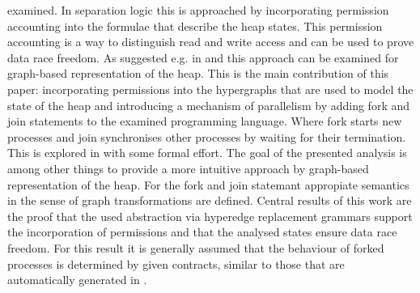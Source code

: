 	examined. In separation logic this is approached by incorporating permission
	accounting into the formulae that describe the heap states. This permission
	accounting is a way to distinguish read and write access and can be used to
	prove data race freedom. As suggested e.g. in \cite{InductivePredicates} and
	\cite{ProcedureSummaries} this approach can be examined for graph-based
	representation of the heap. This is the  main contribution of this paper:
	incorporating permissions into the hypergraphs that are used to model the
	state of the heap and introducing a mechanism of parallelism by adding
	fork and join statements to the examined programming language. Where fork
	starts new processes and join
	synchronises other processes by waiting for their termination. This is
	explored in \cite{MultithreadedJavaPrograms} with some formal effort. The
	goal of the presented analysis is among other things to provide a more
	intuitive approach by graph-based representation of the heap. For the fork
	and join statemant appropiate semantics in the sense of graph
	transformations are defined. Central results of this work are the proof that
	the used abstraction via hyperedge replacement grammars support the
	incorporation of permissions and that the analysed states ensure data race
	freedom. For this result it is generally assumed that the behaviour of
	forked processes is determined by given contracts, similar to those that are
	automatically generated in \cite{ProcedureSummaries}.
